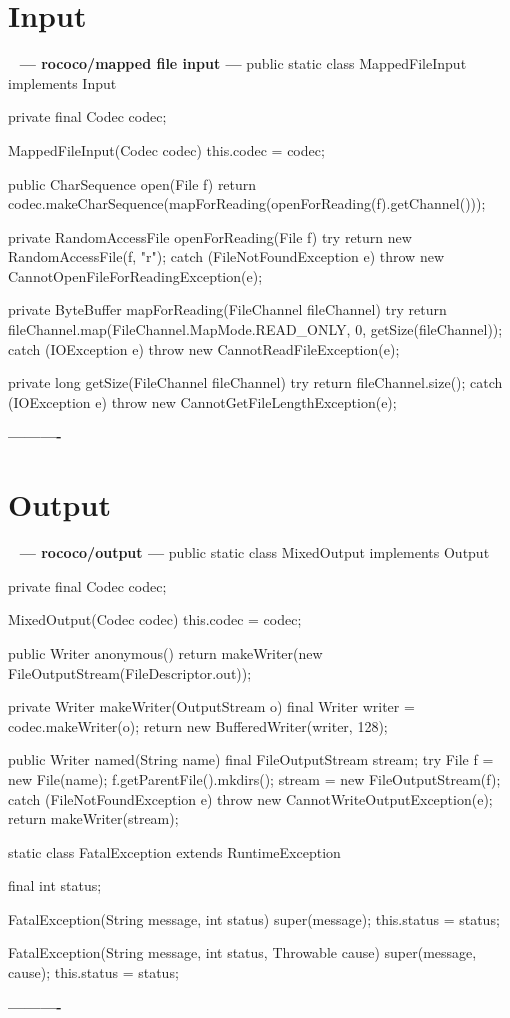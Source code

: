 \documentclass{book}
\newenvironment{chunk}[1]{%
{\ }\newline\noindent%
\hbox{\hskip 2.0cm}{\bf --- #1 ---}%
\verbatim}%                               say exactly what we see
{\endverbatim%
\par{}%
\noindent{}%
\hbox{\hskip 2.0cm}{\bf ----------}%
\par%
\normalsize\noindent}%
\begin{document}
\section{Input}
\begin{chunk}{rococo/mapped file input}
public static class MappedFileInput implements Input {
    private final Codec codec;

    MappedFileInput(Codec codec) {
        this.codec = codec;
    }

    public CharSequence open(File f) {
        return codec.makeCharSequence(mapForReading(openForReading(f).getChannel()));
    }

    private RandomAccessFile openForReading(File f) {
        try {
            return new RandomAccessFile(f, "r");
        } catch (FileNotFoundException e) {
            throw new CannotOpenFileForReadingException(e);
        }
    }

    private ByteBuffer mapForReading(FileChannel fileChannel) {
        try {
            return fileChannel.map(FileChannel.MapMode.READ_ONLY, 0, getSize(fileChannel));
        } catch (IOException e) {
            throw new CannotReadFileException(e);
        }
    }

    private long getSize(FileChannel fileChannel) {
        try {
            return fileChannel.size();
        } catch (IOException e) {
            throw new CannotGetFileLengthException(e);
        }
    }
}
\end{chunk}

\section{Output}
\begin{chunk}{rococo/output}
public static class MixedOutput implements Output {
    private final Codec codec;

    MixedOutput(Codec codec) {
        this.codec = codec;
    }

    public Writer anonymous() {
        return makeWriter(new FileOutputStream(FileDescriptor.out));
    }

    private Writer makeWriter(OutputStream o) {
        final Writer writer = codec.makeWriter(o);
        return new BufferedWriter(writer, 128);
    }

    public Writer named(String name) {
        final FileOutputStream stream;
        try {
            File f = new File(name);
            f.getParentFile().mkdirs();
            stream = new FileOutputStream(f);
        } catch (FileNotFoundException e) {
            throw new CannotWriteOutputException(e);
        }
        return makeWriter(stream);
    }
}

static class FatalException extends RuntimeException {
    final int status;

    FatalException(String message, int status) {
        super(message);
        this.status = status;
    }

    FatalException(String message, int status, Throwable cause) {
        super(message, cause);
        this.status = status;
    }
}
\end{chunk}
\end{document}
